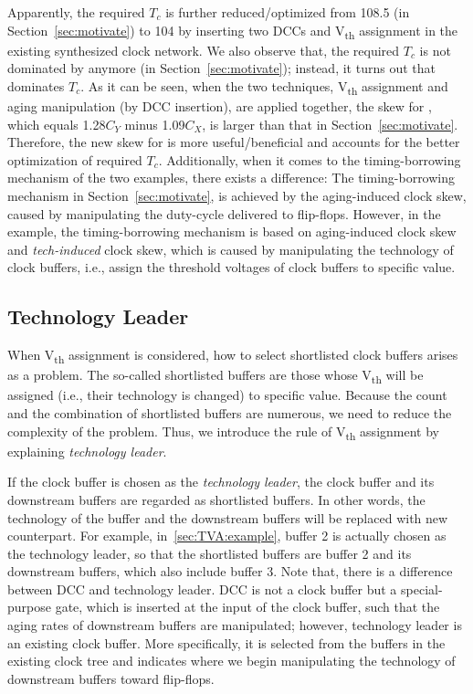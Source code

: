 Apparently, the required $T_c$ is further reduced/optimized from 108.5 (in Section~\ref{sec:motivate}) to 104 by inserting two DCCs and V\textsubscript{th} assignment in the existing synthesized clock network. We also observe that, the required $T_c$ is not dominated by  anymore (in Section~\ref{sec:motivate}); instead, it turns out that  dominates $T_c$. As it can be seen, when the two techniques, V\textsubscript{th} assignment and aging manipulation  (by DCC insertion), are applied together, the skew for , which equals 1.28$C_Y$ minus 1.09$C_X$, is larger than that in Section~\ref{sec:motivate}. Therefore, the new skew for  is more useful/beneficial and accounts for the better optimization of required $T_c$. 
Additionally, when it comes to the timing-borrowing mechanism of the two examples, there exists a difference: The timing-borrowing mechanism in Section~\ref{sec:motivate}, is achieved by the aging-induced clock skew, caused by manipulating the duty-cycle delivered to flip-flops. However, in the example, the timing-borrowing mechanism is based on aging-induced clock skew and \textit{tech-induced} clock skew, which is caused by manipulating the technology of clock buffers, i.e., assign the threshold voltages of clock buffers to specific value. 

\subsection{Technology Leader}
\label{sec:TVA:leader}
When V\textsubscript{th} assignment is considered, how to select shortlisted clock buffers arises as a problem. The so-called shortlisted buffers are those whose V\textsubscript{th} will be assigned (i.e., their technology is changed) to specific value. Because the count and the combination of shortlisted buffers are numerous, we need to reduce the complexity of the problem. Thus, we introduce the rule of V\textsubscript{th} assignment by explaining \textit{technology leader}. 

If the clock buffer is chosen as the \textit{technology leader}, the clock buffer and its downstream buffers are regarded as shortlisted buffers. In other words, the technology of the buffer and the downstream buffers will be replaced with new counterpart. For example, in~\ref{sec:TVA:example}, buffer 2 is actually chosen as the technology leader, so that the shortlisted buffers are buffer 2 and its downstream buffers, which also include buffer 3. Note that, there is a difference between DCC and technology leader. DCC is not a clock buffer but a special-purpose gate, which is inserted at the input of the clock buffer, such that the aging rates of downstream buffers are manipulated; however, technology leader is an existing clock buffer. More specifically, it is selected from the buffers in the existing clock tree and indicates where we begin manipulating the technology of downstream buffers toward flip-flops.

